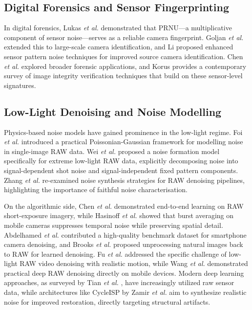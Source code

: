 \documentclass[conference]{IEEEtran}
\begin{document}
\subsection{Digital Forensics and Sensor Fingerprinting}

In digital forensics, Lukas \textit{et al.} \cite{lukas2006digital} demonstrated that PRNU---a multiplicative component of sensor noise---serves as a reliable camera fingerprint. Goljan \textit{et al.} \cite{goljan2009large} extended this to large-scale camera identification, and Li \cite{li2010source} proposed enhanced sensor pattern noise techniques for improved source camera identification. Chen \textit{et al.} \cite{chen2008determining} explored broader forensic applications, and Korus \cite{korus2017digital} provides a contemporary survey of image integrity verification techniques that build on these sensor-level signatures.

\subsection{Low-Light Denoising and Noise Modelling}

Physics-based noise models have gained prominence in the low-light regime. Foi \textit{et al.} \cite{foi2008practical} introduced a practical Poissonian-Gaussian framework for modelling noise in single-image RAW data. Wei \textit{et al.} \cite{wei2020physics} proposed a noise formation model specifically for extreme low-light RAW data, explicitly decomposing noise into signal-dependent shot noise and signal-independent fixed pattern components. Zhang \textit{et al.} \cite{zhang2021rethinking} re-examined noise synthesis strategies for RAW denoising pipelines, highlighting the importance of faithful noise characterisation.

On the algorithmic side, Chen \textit{et al.} \cite{chen2018learning} demonstrated end-to-end learning on RAW short-exposure imagery, while Hasinoff \textit{et al.} \cite{hasinoff2016burst} showed that burst averaging on mobile cameras suppresses temporal noise while preserving spatial detail. Abdelhamed \textit{et al.} \cite{abdelhamed2018high} contributed a high-quality benchmark dataset for smartphone camera denoising, and Brooks \textit{et al.} \cite{brooks2019unprocessing} proposed unprocessing natural images back to RAW for learned denoising. Fu \textit{et al.} \cite{fu2023low} addressed the specific challenge of low-light RAW video denoising with realistic motion, while Wang \textit{et al.} \cite{wang2020practical} demonstrated practical deep RAW denoising directly on mobile devices. Modern deep learning approaches, as surveyed by Tian \textit{et al.} \cite{tian2020deep}, have increasingly utilized raw sensor data, while architectures like CycleISP by Zamir \textit{et al.} \cite{zamir2020cycleisp} aim to synthesize realistic noise for improved restoration, directly targeting structural artifacts.
\end{document}
